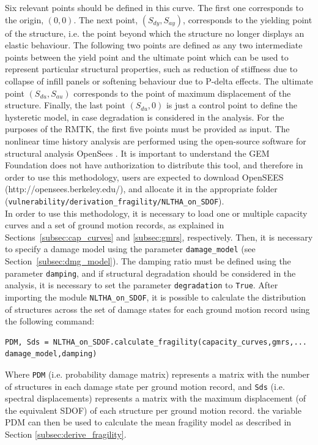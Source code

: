 Six relevant points should be defined in this curve. The first one corresponds to the origin, $(0, 0)$. The next point, $(S_{dy}, S_{ay})$, corresponds to the yielding point of the structure, i.e. the point beyond which the structure no longer displays an elastic behaviour. The following two points are defined as any two intermediate points between the yield point and the ultimate point which can be used to represent particular structural properties, such as reduction of stiffness due to collapse of infill panels or softening behaviour due to P-delta effects. The ultimate point $(S_{du}, S_{au})$ corresponds to the point of maximum displacement of the structure. Finally, the last point $(S_{du}, 0)$ is just a control point to define the hysteretic model, in case degradation is considered in the analysis. For the purposes of the RMTK, the first five points must be provided as input. The nonlinear time history analysis are performed using the open-source software for structural analysis OpenSees \citep{McKennaEtAl2000}. It is important to understand the GEM Foundation does not have authorization to distribute this tool, and therefore in order to use this methodology, users are expected to download OpenSEES (http://opensees.berkeley.edu/), and allocate it in the appropriate folder (\verb=vulnerability/derivation_fragility/NLTHA_on_SDOF=).\\

In order to use this methodology, it is necessary to load one or multiple capacity curves and a set of ground motion records, as explained in Sections~\ref{subsec:cap_curves} and \ref{subsec:gmrs}, respectively. Then, it is necessary to specify a damage model using the parameter \verb=damage_model= (see Section~\ref{subsec:dmg_model}). The damping ratio must be defined using the parameter \verb=damping=, and if structural degradation should be considered in the analysis, it is necessary to set the parameter \verb=degradation= to \verb=True=. After importing the module \verb=NLTHA_on_SDOF=, it is possible to calculate the distribution of structures across the set of damage states for each ground motion record using the following command:

\begin{Verbatim}[frame=single, commandchars=\\\{\}, samepage=true]
PDM, Sds = NLTHA_on_SDOF.calculate_fragility(capacity_curves,gmrs,...
damage_model,damping)
\end{Verbatim}

Where \verb=PDM= (i.e. probability damage matrix) represents a matrix with the number of structures in each damage state per ground motion record, and \verb=Sds= (i.e. spectral displacements) represents a matrix with the maximum displacement (of the equivalent SDOF) of each structure per ground motion record. the variable PDM can then be used to calculate the mean fragility model as described in Section \ref{subsec:derive_fragility}.